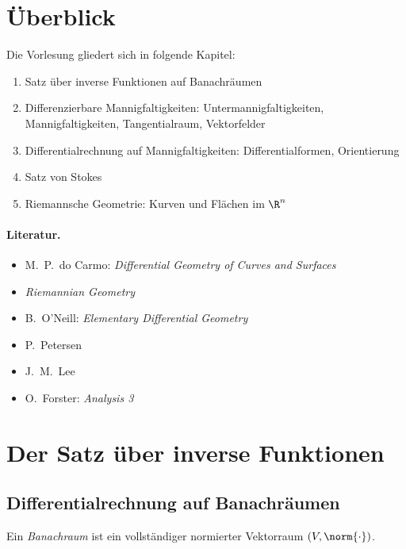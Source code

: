\documentclass[11pt]{article}
\begin{document}

\tableofcontents

\newpage
\section*{Überblick}

Die Vorlesung gliedert sich in folgende Kapitel:
\begin{enumerate}
  \item Satz über inverse Funktionen auf Banachräumen
  \item Differenzierbare Mannigfaltigkeiten: Untermannigfaltigkeiten, Mannigfaltigkeiten,
    Tangentialraum, Vektorfelder
  \item Differentialrechnung auf Mannigfaltigkeiten: Differentialformen, Orientierung
  \item Satz von Stokes
  \item Riemannsche Geometrie: Kurven und Flächen im $\R^n$
\end{enumerate}

\paragraph{Literatur.}
\begin{itemize}
  \item M.~P.~do Carmo: \textit{Differential Geometry of Curves and Surfaces}
  \item \textit{Riemannian Geometry} \item B.~O'Neill: \textit{Elementary Differential Geometry} \item P.~Petersen \item J.~M.~Lee \item O.~Forster: \textit{Analysis 3}
\end{itemize}

\section{Der Satz über inverse Funktionen}

\subsection{Differentialrechnung auf Banachräumen}

\begin{definition}[Banachraum]\Theorem
  Ein \emph{Banachraum} ist ein vollständiger normierter Vektorraum $(V, \norm{\cdot})$.
\end{definition}
\end{document}
